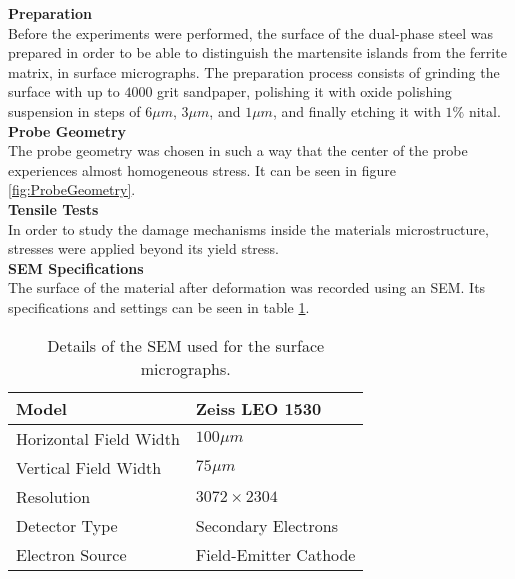 \textbf{Preparation} \\
Before the experiments were performed, the surface of the dual-phase steel was prepared in order to be able to distinguish the martensite islands from the ferrite matrix, in surface micrographs. The preparation process consists of grinding the surface with up to $4000$ grit sandpaper, polishing it with oxide polishing suspension in steps of $6\mu m$, $3\mu m$, and $1\mu m$, and finally etching it with $1 \%$ nital. \\

\noindent \textbf{Probe Geometry} \\
The probe geometry was chosen in such a way that the center of the probe experiences almost homogeneous stress. It can be seen in figure \ref{fig:ProbeGeometry}. \\

\noindent \textbf{Tensile Tests}\\
In order to study the damage mechanisms inside the materials microstructure, stresses were applied beyond its yield stress. \\

\noindent \textbf{SEM Specifications} \\
The surface of the material after deformation was recorded using an SEM. Its specifications and settings can be seen in table \ref{tab:SEM}. \\

\begin{table}[H]
 \begin{center}
  \begin{tabular}{@{} *2l @{}} \toprule[2pt]
   Model & Zeiss LEO 1530 \\\midrule
   Horizontal Field Width & $100\mu m$   \\ 
   Vertical Field Width  & $75\mu m$ \\ 
   Resolution  & $3072\times 2304$ \\
   Detector Type & Secondary Electrons \\
   Electron Source & Field-Emitter Cathode \\ \bottomrule[2pt]

  \end{tabular}
 \end{center}
 \caption{Details of the SEM used for the surface micrographs.}
   \label{tab:SEM}
\end{table}
